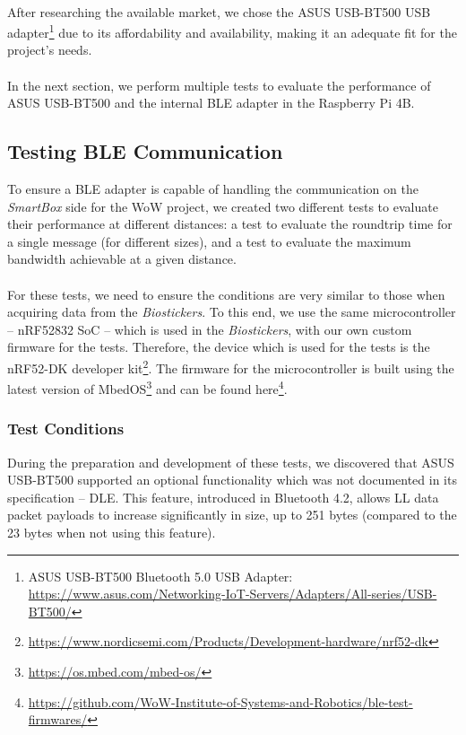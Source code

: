 \paragraph{} After researching the available market, we chose the ASUS USB-BT500 USB adapter\footnote{ASUS USB-BT500 Bluetooth 5.0 USB Adapter: \url{https://www.asus.com/Networking-IoT-Servers/Adapters/All-series/USB-BT500/}} due to its affordability and availability, making it an adequate fit for the project's needs.

\paragraph{} In the next section, we perform multiple tests to evaluate the performance of ASUS USB-BT500 and the internal \acs{BLE} adapter in the Raspberry Pi 4B.

\subsection{Testing \acs{BLE} Communication} 

To ensure a \acs{BLE} adapter is capable of handling the communication on the \textit{SmartBox} side for the \acs{WoW} project, we created two different tests to evaluate their performance at different distances: a test to evaluate the roundtrip time for a single message (for different sizes), and a test to evaluate the maximum bandwidth achievable at a given distance.

\paragraph{} For these tests, we need to ensure the conditions are very similar to those when acquiring data from the \textit{Biostickers}. To this end, we use the same microcontroller -- nRF52832 \acs{SoC} -- which is used in the \textit{Biostickers}, with our own custom firmware for the tests. Therefore, the device which is used for the tests is the nRF52-DK developer kit\footnote{\url{https://www.nordicsemi.com/Products/Development-hardware/nrf52-dk}}. The firmware for the microcontroller is built using the latest version of MbedOS\footnote{\url{https://os.mbed.com/mbed-os/}} and can be found here\footnote{\url{https://github.com/WoW-Institute-of-Systems-and-Robotics/ble-test-firmwares/}}.

\subsubsection{Test Conditions}
\label{sec:ble_test_conditions}
During the preparation and development of these tests, we discovered that ASUS USB-BT500 supported an optional functionality which was not documented in its specification -- \acf{DLE}. This feature, introduced in Bluetooth 4.2, allows \acs{LL} data packet payloads to increase significantly in size, up to 251 bytes (compared to the 23 bytes when not using this feature).

